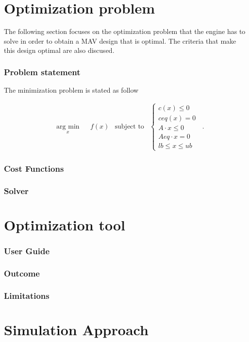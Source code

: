 \section{Optimization problem}
\label{sec:optimization_problem}
The following section focuses on the optimization problem that the engine has to
solve in order to obtain a MAV design that is optimal. The criteria that make
this design optimal are also discused.

\subsubsection{Problem statement}
\label{sec:problem}
 The minimization problem is stated as follow

 \begin{equation}
   \label{opt_pb}
   \begin{aligned}
    & \underset{x}{\text{arg min}}
    & & f(x) &\text{subject to} &
    \begin{cases}
      c(x) \leq 0 \\
      ceq(x) = 0 \\
      A\cdot x \leq 0 \\
      Aeq \cdot x = 0 \\
      lb \leq x \leq ub
    \end{cases}
    \end{aligned}\, .
 \end{equation}

\subsubsection{Cost Functions}
\label{sec:cost_functions}

\subsubsection{Solver}
\label{sec:solver}

\section{Optimization tool}
\label{sec:optimization_tool}

\subsubsection{User Guide}
\label{sec:user_guide}

\subsubsection{Outcome}
\label{sec:outcome}

\subsubsection{Limitations}
\label{sec:limitations}

\section{Simulation Approach}
\label{sec:control_approach}

